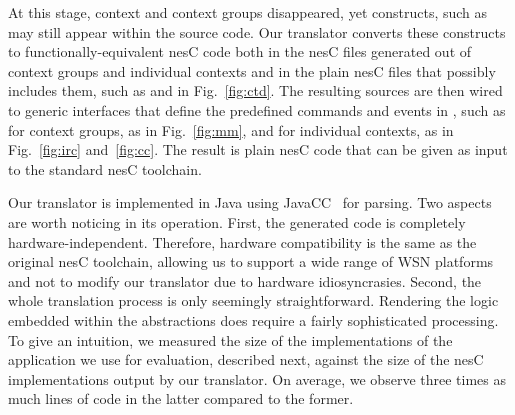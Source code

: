 At this stage, context and context groups disappeared, yet \conesc
constructs, such as  may still appear within the source
code. Our translator converts these constructs to
functionally-equivalent nesC code both in the nesC files generated out
of context groups and individual contexts and in the plain nesC files
that possibly includes them, such as  and  in
Fig.~\ref{fig:ctd}. The resulting sources are then wired to generic
interfaces that define the predefined commands and events in \conesc,
such as  for context groups, as in
Fig.~\ref{fig:mm}, and  for individual
contexts, as in Fig.~\ref{fig:irc} and~\ref{fig:cc}. The result is
plain nesC code that can be given as input to the standard nesC
toolchain.




Our translator is implemented in Java using JavaCC~\cite{javacc} for
parsing. Two aspects are worth noticing in its operation. First, the
generated code is completely hardware-independent. Therefore, hardware
compatibility is the same as the original nesC toolchain, allowing us
to support a wide range of WSN platforms and not to modify our
translator due to hardware idiosyncrasies. Second, the whole
translation process is only seemingly straightforward. Rendering the
logic embedded within the \conesc abstractions does require a fairly
sophisticated processing. To give an intuition, we measured the size
of the \conesc implementations of the application we use for
evaluation, described next, against the size of the nesC
implementations output by our translator. On average, we observe three
times as much lines of code in the latter compared to the former.

